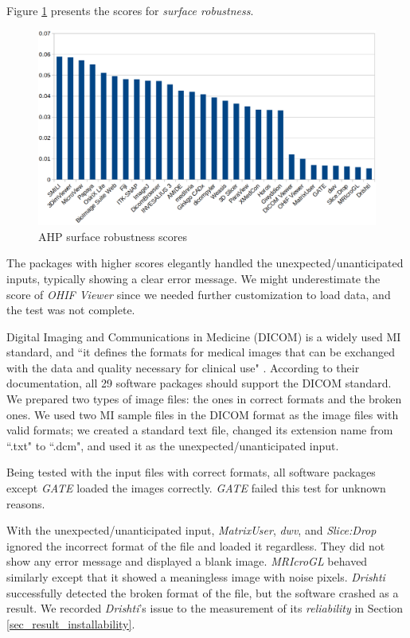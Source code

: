 \documentclass[preprint,12pt,authoryear]{elsarticle}
\begin{document}
Figure \ref{fg_robustness_scores} presents the scores for \textit{surface
robustness}.

\begin{figure}[ht]
\includegraphics[scale=0.38]{figures/robustness_scores.png}
\caption{AHP surface robustness scores}
\label{fg_robustness_scores}
\end{figure}

The packages with higher scores elegantly handled the unexpected/unanticipated
inputs, typically showing a clear error message. We might underestimate the
score of \textit{OHIF Viewer} since we needed further customization to load
data, and the test was not complete.

Digital Imaging and Communications in Medicine (DICOM) is a widely used MI
standard, and ``it defines the formats for medical images that can be exchanged
with the data and quality necessary for clinical use" \citep{MITA2021}. According
to their documentation, all 29 software packages should support the DICOM
standard. We prepared two types of image files: the ones in correct formats and
the broken ones. We used two MI sample files in the DICOM format as the image
files with valid formats; we created a standard text file, changed its extension
name from ``.txt" to ``.dcm", and used it as the unexpected/unanticipated input.

Being tested with the input files with correct formats, all software packages
except \textit{GATE} loaded the images correctly. \textit{GATE} failed this test
for unknown reasons.

With the unexpected/unanticipated input, \textit{MatrixUser}, \textit{dwv}, and
\textit{Slice:Drop} ignored the incorrect format of the file and loaded it
regardless. They did not show any error message and displayed a blank image.
\textit{MRIcroGL} behaved similarly except that it showed a meaningless image
with noise pixels. \textit{Drishti} successfully detected the broken format of
the file, but the software crashed as a result. We recorded \textit{Drishti}'s
issue to the measurement of its \textit{reliability} in Section
\ref{sec_result_installability}.
\end{document}
